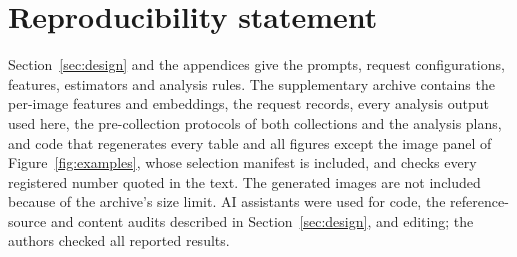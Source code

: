 \documentclass[10pt]{article}
\begin{document}
\section*{Reproducibility statement}
Section~\ref{sec:design} and the appendices give the prompts, request configurations, features,
estimators and analysis rules. The supplementary archive contains the per-image features and
embeddings, the request records, every analysis output used here, the pre-collection protocols of
both collections and the analysis plans, and code that regenerates every table and all figures except the image panel of
Figure~\ref{fig:examples}, whose selection manifest is included, and checks every registered number
quoted in the text. The generated images are not included because of the archive's size limit. AI
assistants were used for code, the reference-source and content audits described in
Section~\ref{sec:design}, and editing; the authors checked all reported results.




\clearpage
\appendix

\end{document}
